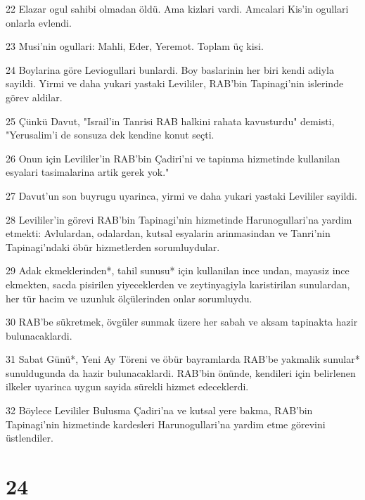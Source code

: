 \par 22 Elazar ogul sahibi olmadan öldü. Ama kizlari vardi. Amcalari Kis'in ogullari onlarla evlendi.
\par 23 Musi'nin ogullari: Mahli, Eder, Yeremot. Toplam üç kisi.
\par 24 Boylarina göre Leviogullari bunlardi. Boy baslarinin her biri kendi adiyla sayildi. Yirmi ve daha yukari yastaki Levililer, RAB'bin Tapinagi'nin islerinde görev aldilar.
\par 25 Çünkü Davut, "Israil'in Tanrisi RAB halkini rahata kavusturdu" demisti, "Yerusalim'i de sonsuza dek kendine konut seçti.
\par 26 Onun için Levililer'in RAB'bin Çadiri'ni ve tapinma hizmetinde kullanilan esyalari tasimalarina artik gerek yok."
\par 27 Davut'un son buyrugu uyarinca, yirmi ve daha yukari yastaki Levililer sayildi.
\par 28 Levililer'in görevi RAB'bin Tapinagi'nin hizmetinde Harunogullari'na yardim etmekti: Avlulardan, odalardan, kutsal esyalarin arinmasindan ve Tanri'nin Tapinagi'ndaki öbür hizmetlerden sorumluydular.
\par 29 Adak ekmeklerinden*, tahil sunusu* için kullanilan ince undan, mayasiz ince ekmekten, sacda pisirilen yiyeceklerden ve zeytinyagiyla karistirilan sunulardan, her tür hacim ve uzunluk ölçülerinden onlar sorumluydu.
\par 30 RAB'be sükretmek, övgüler sunmak üzere her sabah ve aksam tapinakta hazir bulunacaklardi.
\par 31 Sabat Günü*, Yeni Ay Töreni ve öbür bayramlarda RAB'be yakmalik sunular* sunuldugunda da hazir bulunacaklardi. RAB'bin önünde, kendileri için belirlenen ilkeler uyarinca uygun sayida sürekli hizmet edeceklerdi.
\par 32 Böylece Levililer Bulusma Çadiri'na ve kutsal yere bakma, RAB'bin Tapinagi'nin hizmetinde kardesleri Harunogullari'na yardim etme görevini üstlendiler.

\chapter{24}

